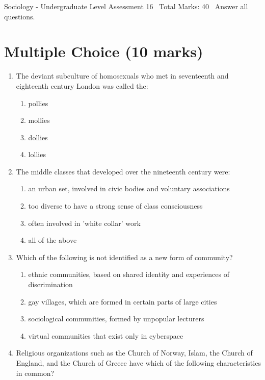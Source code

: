 \documentclass[12pt]{article}
\begin{document}
\begin{center}
Sociology - Undergraduate Level Assessment 16 \
Total Marks: 40 \
Answer all questions.
\end{center}

\section*{Multiple Choice (10 marks)}
\begin{enumerate}[label=\arabic*.]
\item The deviant subculture of homosexuals who met in seventeenth and eighteenth century London was called the:
\begin{enumerate}[label=(\alph*)]
    \item pollies
    \item mollies
    \item dollies
    \item lollies
\end{enumerate}
\item The middle classes that developed over the nineteenth century were:
\begin{enumerate}[label=(\alph*)]
    \item an urban set, involved in civic bodies and voluntary associations
    \item too diverse to have a strong sense of class consciousness
    \item often involved in 'white collar' work
    \item all of the above
\end{enumerate}
\item Which of the following is not identified as a new form of community?
\begin{enumerate}[label=(\alph*)]
    \item ethnic communities, based on shared identity and experiences of discrimination
    \item gay villages, which are formed in certain parts of large cities
    \item sociological communities, formed by unpopular lecturers
    \item virtual communities that exist only in cyberspace
\end{enumerate}
\item Religious organizations such as the Church of Norway, Islam, the Church of England, and the Church of Greece have which of the following characteristics in common?
\begin{enumerate}[label=(\alph*)]

\end{enumerate}
\end{enumerate}
\end{document}
